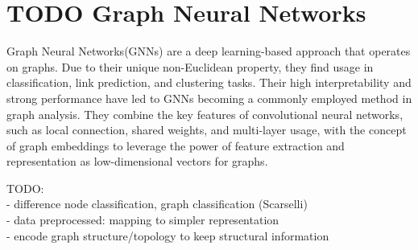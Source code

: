 \section{TODO Graph Neural Networks}

Graph Neural Networks(GNNs)\cite{4700287} are a deep learning-based approach that operates on graphs. Due to their unique non-Euclidean property, they find usage in classification, link prediction, and clustering tasks. Their high interpretability and strong performance have led to GNNs becoming a commonly employed method in graph analysis. They combine the key features of convolutional neural networks\cite{726791}, such as local connection, shared weights, and multi-layer usage, with the concept of graph embeddings\cite{cai2018comprehensive} to leverage the power of feature extraction and representation as low-dimensional vectors for graphs\cite{Liu2020}. \bigskip

TODO: \\
- difference node classification, graph classification (Scarselli) \\
- data preprocessed: mapping to simpler representation \\
- encode graph structure/topology to keep structural information \bigskip

